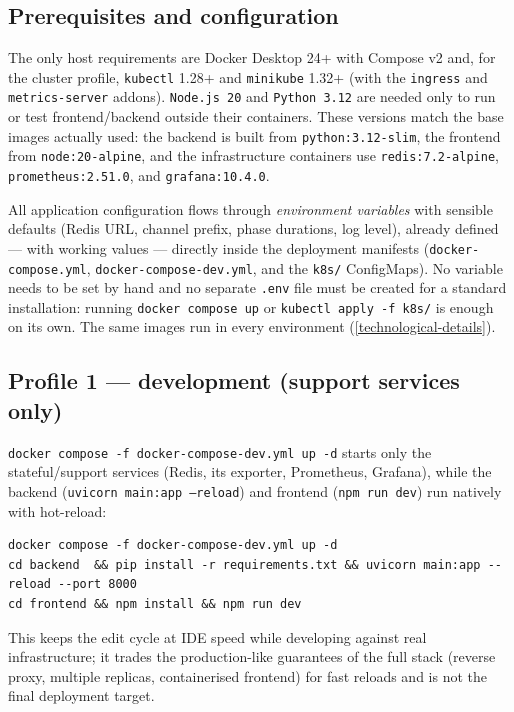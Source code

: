 \documentclass{scrartcl}
\begin{document}
\subsection{Prerequisites and configuration}\label{prerequisites}

The only host requirements are Docker Desktop 24+ with Compose v2 and, for the
cluster profile, \texttt{kubectl} 1.28+ and \texttt{minikube} 1.32+ (with the
\texttt{ingress} and \texttt{metrics-server} addons). \texttt{Node.js 20} and
\texttt{Python 3.12} are needed only to run or test frontend/backend outside their
containers. These versions match the base images actually used: the backend is
built from \texttt{python:3.12-slim}, the frontend from \texttt{node:20-alpine},
and the infrastructure containers use \texttt{redis:7.2-alpine},
\texttt{prometheus:2.51.0}, and \texttt{grafana:10.4.0}.

All application configuration flows through \emph{environment variables} with
sensible defaults (Redis URL, channel prefix, phase durations, log level), already
defined --- with working values --- directly inside the deployment manifests
(\texttt{docker-compose.yml}, \texttt{docker-compose-dev.yml}, and the
\texttt{k8s/} ConfigMaps). No variable needs to be set by hand and no separate
\texttt{.env} file must be created for a standard installation: running
\texttt{docker compose up} or \texttt{kubectl apply -f k8s/} is enough on its own.
The same images run in every environment (\cref{technological-details}).

\subsection{Profile 1 --- development (support services only)}\label{profile-dev}

\texttt{docker compose -f docker-compose-dev.yml up -d} starts only the
stateful/support services (Redis, its exporter, Prometheus, Grafana), while the
backend (\texttt{uvicorn main:app --reload}) and frontend (\texttt{npm run dev})
run natively with hot-reload:

\begin{verbatim}
docker compose -f docker-compose-dev.yml up -d
cd backend  && pip install -r requirements.txt && uvicorn main:app --reload --port 8000
cd frontend && npm install && npm run dev
\end{verbatim}

This keeps the edit cycle at IDE speed while developing against real
infrastructure; it trades the production-like guarantees of the full stack
(reverse proxy, multiple replicas, containerised frontend) for fast reloads and is
not the final deployment target.
\end{document}
